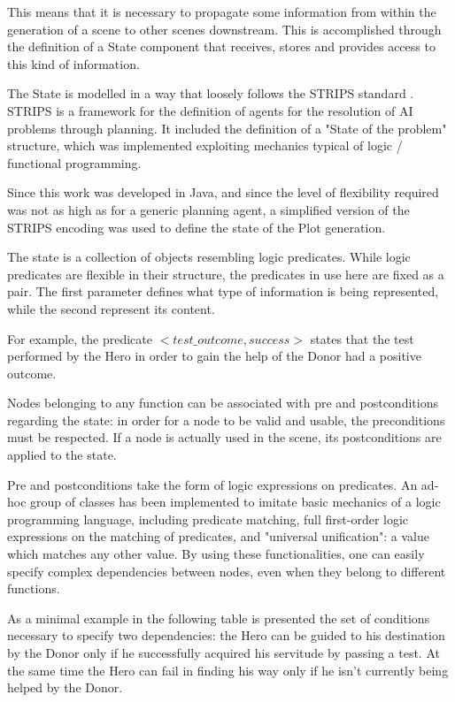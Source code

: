 \documentclass[12pt,a4paper,oneside]{report}
\begin{document}
This means that it is necessary to propagate some information from within the generation of a scene to other scenes downstream. This is accomplished through the definition of a State component that receives, stores and provides access to this kind of information.

\bigskip

The State is modelled in a way that loosely follows the STRIPS standard \cite{strips}. STRIPS is a framework for the definition of agents for the resolution of AI problems through planning. It included the definition of a "State of the problem" structure, which was implemented exploiting mechanics typical of logic / functional programming.

Since this work was developed in Java, and since the level of flexibility required was not as high as for a generic planning agent, a simplified version of the STRIPS encoding was used to define the state of the Plot generation.

\bigskip

The state is a collection of objects resembling logic predicates. While logic predicates are flexible in their structure, the predicates in use here are fixed as a \(<String,String>\) pair. The first parameter defines what type of information is being represented, while the second represent its content.

For example, the predicate \(<test\_outcome, success>\) states that the test performed by the Hero in order to gain the help of the Donor had a positive outcome.

\bigskip

Nodes belonging to any function can be associated with pre and postconditions regarding the state: in order for a node to be valid and usable, the preconditions must be respected. If a node is actually used in the scene, its postconditions are applied to the state.

\bigskip

Pre and postconditions take the form of logic expressions on predicates. An ad-hoc group of classes has been implemented to imitate basic mechanics of a logic programming language, including predicate matching, full first-order logic expressions on the matching of predicates, and "universal unification": a value which matches any other value. By using these functionalities, one can easily specify complex dependencies between nodes, even when they belong to different functions.

\bigskip

As a minimal example in the following table is presented the set of conditions necessary to specify two dependencies: the Hero can be guided to his destination by the Donor only if he successfully acquired his servitude by passing a test. At the same time the Hero can fail in finding his way only if he isn't currently being helped by the Donor.
\end{document}
